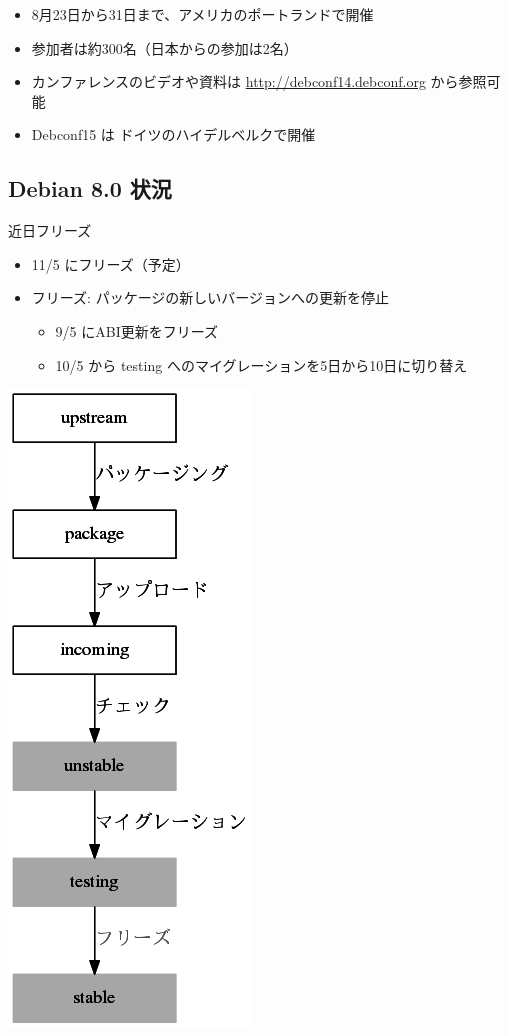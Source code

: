 \documentclass[mingoth,a4paper]{jsarticle}
\begin{document}
\begin{itemize}
\item 8月23日から31日まで、アメリカのポートランドで開催
\item 参加者は約300名（日本からの参加は2名）
\item カンファレンスのビデオや資料は \url{http://debconf14.debconf.org}
から参照可能
\item Debconf15 は ドイツのハイデルベルクで開催
\end{itemize}


\subsection{Debian 8.0 状況}

近日フリーズ

\begin{minipage}{0.55\hsize}
\begin{itemize}
\item 11/5 にフリーズ（予定）
\item フリーズ: パッケージの新しいバージョンへの更新を停止
\begin{itemize}
\item 9/5 にABI更新をフリーズ
\item 10/5 から testing へのマイグレーションを5日から10日に切り替え
\end{itemize}
\end{itemize}
\end{minipage}
\begin{minipage}{0.39\hsize}
\begin{center}
\includegraphics[scale=0.3]{image201410/lifesycle-package_mono.png}
\end{center}
\end{minipage}
\end{document}
